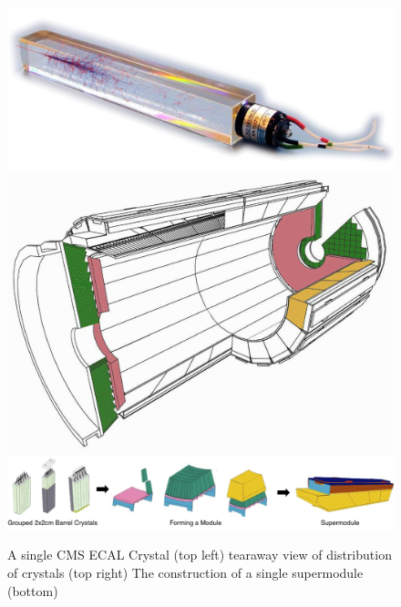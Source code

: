 \begin{figure}
\begin{center}
\includegraphics[width=.45\textwidth]{pics/ecal_crystal}
\includegraphics[width=.45\textwidth]{pics/ecal_diagram}
\includegraphics[width=.95\textwidth]{pics/Supermodule}
\end{center}
\caption{A single CMS ECAL Crystal (top left) tearaway view of distribution of crystals (top right) The construction of a single supermodule (bottom)   }
\label{fig:ecal_cryastal}
\end{figure}

